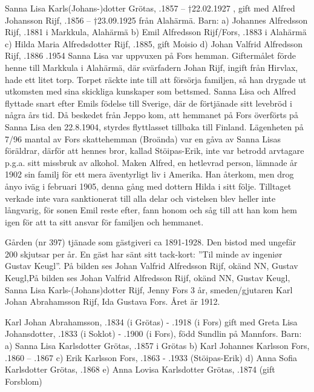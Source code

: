 Sanna Lisa Karls(Johans-)dotter Grötas, .1857 – †22.02.1927 , gift med Alfred Johansson Rijf, .1856 – †23.09.1925 från Alahärmä.
Barn: a) Johannes Alfredsson Rijf, .1881 i Markkula, Alahärmä
b) Emil Alfredsson Rijf/Fors, .1883 i Alahärmä
c) Hilda Maria Alfredsdotter Rijf, .1885, gift Moisio d) Johan Valfrid Alfredsson Rijf, .1886 .1954
Sanna Lisa var uppvuxen på Fors hemman. Giftermålet förde henne till Markkula i Alahärmä, där svärfadern Johan Rijf, ingift från Hirvlax, hade ett litet torp. Torpet räckte inte till att försörja familjen, så han drygade ut utkomsten med sina skickliga kunskaper som bettsmed.
Sanna Lisa och Alfred flyttade snart efter Emils födelse till Sverige, där de förtjänade sitt levebröd i några års tid. Då beskedet från Jeppo kom, att hemmanet på Fors överförts på Sanna Lisa den 22.8.1904, styrdes flyttlasset tillbaka till Finland. Lägenheten på 7/96 mantal av Fors skattehemman (Broända) var en gåva av Sanna Lisas föräldrar, därför att hennes bror, kallad Stöipas-Erik, inte var betrodd arvtagare p.g.a. sitt missbruk av alkohol.
Maken Alfred, en hetlevrad person, lämnade år 1902 sin familj för ett mera äventyrligt liv i Amerika. Han återkom, men drog ånyo iväg i februari 1905, denna gång med dottern Hilda i sitt följe. Tilltaget verkade inte vara sanktionerat till alla delar och vistelsen blev heller inte långvarig, för sonen Emil reste efter, fann honom och såg till att han kom hem igen för att ta sitt ansvar för familjen och hemmanet.


Gården (nr 397) tjänade som gästgiveri ca 1891-1928. Den bistod med ungefär 200 skjutsar per år. En gäst har sänt sitt tack-kort: ”Til minde av ingeniør Gustav Keugl”. På bilden ses Johan Valfrid Alfredsson Rijf, okänd NN, Gustav Keugl,På bilden ses Johan Valfrid Alfredsson Rijf, okänd 	NN, Gustav Keugl, Sanna Lisa Karls-(Johans)dotter Rijf, Jenny Fors 3 år, 	smeden/gjutaren Karl Johan Abrahamsson Rijf, Ida Gustava Fors. Året är 1912.



Karl Johan Abrahamsson, .1834 (i Grötas) - .1918 (i Fors) gift med Greta Lisa Johansdotter, .1833 (i Soklot) - .1900 (i Fors), född Sundlin på Mannfors.
Barn:
a) Sanna Lisa Karlsdotter Grötas, .1857 i Grötas
b) Karl Johannes Karlsson Fors, .1860 – .1867
c) Erik Karlsson Fors, .1863 - .1933 (Stöipas-Erik) d) Anna Sofia Karlsdotter Grötas, .1868
e) Anna Lovisa Karlsdotter Grötas, .1874 (gift Forsblom)

